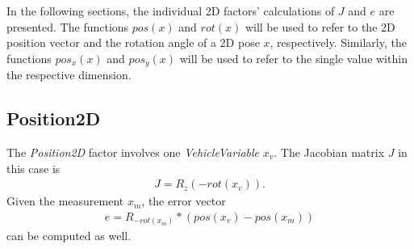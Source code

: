 In the following sections, the individual 2D factors' calculations of $J$ and $e$ are presented. The functions $pos(x)$ and $rot(x)$ will be used to refer to the 2D position vector and the rotation angle of a 2D pose $x$, respectively. Similarly, the functions $pos_x(x)$ and $pos_y(x)$ will be used to refer to the single value within the respective dimension.

\subsection{Position2D}

The \textit{Position2D} factor involves one \textit{VehicleVariable} $x_v$. The Jacobian matrix $J$ in this case is
\begin{align}
	J = R_z(-rot(x_v)).
\end{align}
Given the measurement $x_m$, the error vector
\begin{align}
	e = R_{-rot(x_m)} * (pos(x_v) - pos(x_m))
\end{align}
can be computed as well.

